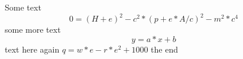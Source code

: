 \documentclass[a5paper,8pt]{article}
\begin{document}
Some text
\begin{equation}
    0 = (H + e)^2 - c^2 * (p + e * A / c)^2 - m^2 * c^4
\end{equation}
some more text
$$y = a * x + b$$
text here again
$q = w * e - r * e ^ 2 + 1000$
the end
\end{document}

